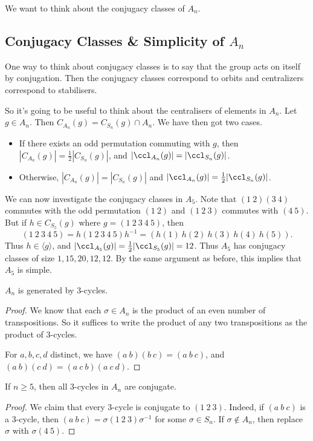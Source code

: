 We want to think about the conjugacy classes of $A_n$.

\subsection{Conjugacy Classes \& Simplicity of $A_n$}

One way to think about conjugacy classes is to say that the group acts on itself by conjugation. Then the conjugacy classes correspond to orbits and centralizers correspond to stabilisers.

So it's going to be useful to think about the centralisers of elements in $A_n$. 
Let $g \in A_n$. Then $C_{A_n}(g) = C_{S_n}(g) \cap A_n$. We have then got two cases.
\begin{itemize}
	\item If there exists an odd permutation commuting with $g$, then $|C_{A_n}(g)| = \frac{1}{2}|C_{S_n}(g)|$, and $|\ccl_{A_n}(g)| = |\ccl_{S_n}(g)|$.
	\item  Otherwise, $|C_{A_n}(g)| = |C_{S_n}(g)|$ and $|\ccl_{A_n}(g)| = \frac{1}{2}|\ccl_{S_n}(g)|$.
\end{itemize}

\begin{example}
	We can now investigate the conjugacy classes in $A_5$. Note that $(1\ 2)(3\ 4)$ commutes with the odd permutation $(1\ 2)$ and $(1\ 2\ 3)$ commutes with $(4\ 5)$. But if $h \in C_{S_5}(g)$ where $g = (1\ 2\ 3\ 4\ 5)$, then
	$$
(1\ 2\ 3\ 4\ 5) = h (1\ 2\ 3\ 4\ 5) h^{-1} = (h(1)\ h(2)\ h(3)\ h(4)\ h(5)).
	$$
	Thus $h \in \langle g \rangle$, and $|\ccl_{A_5}(g)| = \frac{1}{2}|\ccl_{S_5}(g)| = 12$. Thus $A_5$ has conjugacy classes of size $1, 15, 20, 12, 12$. By the same argument as before, this implies that $A_5$ is simple.
\end{example}

\begin{lemma}[Generators of $A_n$]
	$A_n$ is generated by 3-cycles.
\end{lemma}
\begin{proof}
	We know that each $\sigma \in A_n$ is the product of an even number of transpositions. So it suffices to write the product of any two transpositions as the product of 3-cycles. 

	For $a, b, c, d$ distinct, we have $(a\ b)(b\ c) = (a\ b\ c)$, and $(a\ b)(c\ d) = (a\ c\ b)(a\ c\ d)$.
\end{proof}

\begin{lemma}
	If $n \geq 5$, then all $3$-cycles in $A_n$ are conjugate.
\end{lemma}
\begin{proof}
	We claim that every 3-cycle is conjugate to $(1\ 2\ 3)$. Indeed, if $(a\ b\ c)$ is a 3-cycle, then $(a\ b\ c)=\sigma (1\ 2\ 3)\sigma^{-1}$ for some $\sigma \in S_n$. If $\sigma \not \in A_n$, then replace $\sigma$ with $\sigma (4\ 5)$.
\end{proof}

